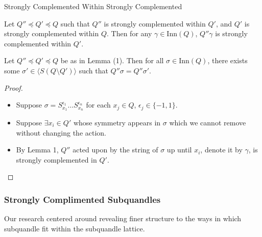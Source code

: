 \documentclass[10pt]{beamer}
\newcommand{\sq}{\preccurlyeq} %
\newcommand{\Inn}{\mathrm{Inn}} %
\theoremstyle{plain}
\begin{document}
\begin{frame}{Strongly Complemented Within Strongly Complemented}


    \begin{lemma}[1]
    Let $Q''\sq Q' \sq Q$ such that $Q''$ is strongly complemented within $Q'$, and $Q'$ is strongly complemented within $Q$. Then for any $\gamma\in \Inn(Q)$, $Q''\gamma$ is strongly complemented within $Q'$.
    \end{lemma}
    \pause
    \begin{lemma}[2]
    Let $Q''\sq Q' \sq Q$ be as in Lemma (1). Then for all $\sigma\in \Inn(Q)$, there exists some $\sigma'\in \langle S(Q\setminus Q')\rangle$ such that $Q''\sigma = Q''\sigma'$.
    \end{lemma}
    \begin{proof}
    \begin{itemize}
        \item Suppose $\sigma = S_{x_1}^{\epsilon_1}\dots S_{x_n}^{\epsilon_n}$ for each $x_j\in Q$, $\epsilon_j \in \{-1,1\}$.
        \item Suppose $\exists x_i \in Q'$ whose symmetry appears in $\sigma$ which we cannot remove without changing the action.
        \item By Lemma 1, $Q''$ acted upon by the string of $\sigma$ up until $x_i$, denote it by $\gamma$, is strongly complemented in $Q'$.
    \end{itemize}
    \end{proof}
    \end{frame}

    \begin{frame}
        \frametitle{Strongly Complimented Subquandles}

        Our research centered around revealing finer structure to the ways in which subquandle 
        fit within the subquandle lattice.
    \end{frame}
\end{document}

